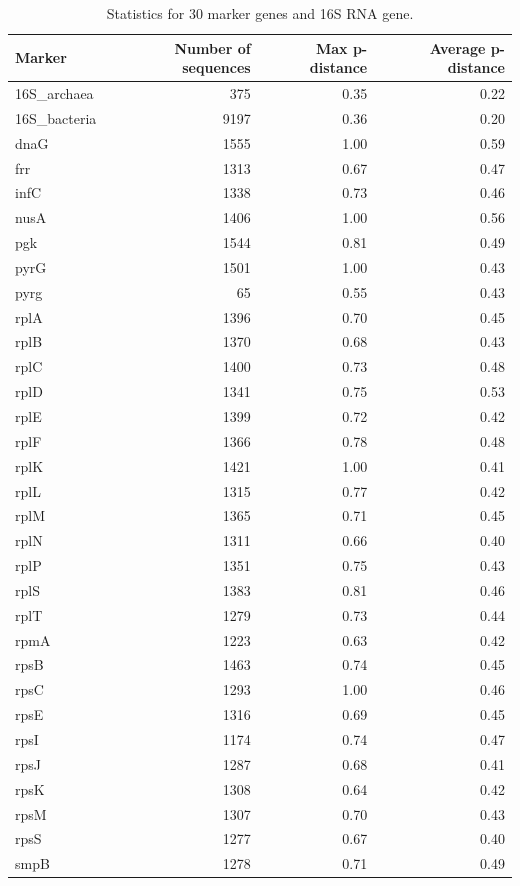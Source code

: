 \begin{table}[p]
\caption[Marker Gene statistics.]{\label{tipp:marker_stats}Statistics for 
30 marker genes and 16S RNA gene.  }
\begin{center}
\begin{tabular}{|l|r|r|r|}
\hline
Marker & Number of sequences & Max p-distance & Average p-distance \\
\hline
16S\_archaea & 375 & 0.35 & 0.22 \\
16S\_bacteria & 9197 & 0.36 & 0.20 \\
dnaG & 1555 & 1.00 & 0.59 \\
frr & 1313 & 0.67 & 0.47 \\
infC & 1338 & 0.73 & 0.46 \\
nusA & 1406 & 1.00 & 0.56 \\
pgk & 1544 & 0.81 & 0.49 \\
pyrG & 1501 & 1.00 & 0.43 \\
pyrg & 65 & 0.55 & 0.43 \\
rplA & 1396 & 0.70 & 0.45 \\
rplB & 1370 & 0.68 & 0.43 \\
rplC & 1400 & 0.73 & 0.48 \\
rplD & 1341 & 0.75 & 0.53 \\
rplE & 1399 & 0.72 & 0.42 \\
rplF & 1366 & 0.78 & 0.48 \\
rplK & 1421 & 1.00 & 0.41 \\
rplL & 1315 & 0.77 & 0.42 \\
rplM & 1365 & 0.71 & 0.45 \\
rplN & 1311 & 0.66 & 0.40 \\
rplP & 1351 & 0.75 & 0.43 \\
rplS & 1383 & 0.81 & 0.46 \\
rplT & 1279 & 0.73 & 0.44 \\
rpmA & 1223 & 0.63 & 0.42 \\
rpsB & 1463 & 0.74 & 0.45 \\
rpsC & 1293 & 1.00 & 0.46 \\
rpsE & 1316 & 0.69 & 0.45 \\
rpsI & 1174 & 0.74 & 0.47 \\
rpsJ & 1287 & 0.68 & 0.41 \\
rpsK & 1308 & 0.64 & 0.42 \\
rpsM & 1307 & 0.70 & 0.43 \\
rpsS & 1277 & 0.67 & 0.40 \\
smpB & 1278 & 0.71 & 0.49 \\
\hline
\end{tabular}
\end{center}

\end{table}


